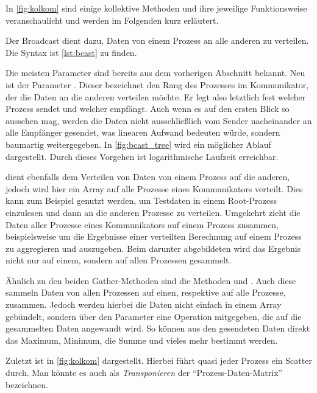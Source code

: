       In \autoref{fig:kolkom} sind einige kollektive Methoden und ihre jeweilige Funktionsweise veranschaulicht und werden im Folgenden kurz erläutert.
      
      Der Broadcast dient dazu, Daten von einem Prozess an alle anderen zu verteilen. Die Syntax ist \autoref{lst:bcast} zu finden.

      Die meisten Parameter sind bereits aus dem vorherigen Abschnitt bekannt. Neu ist der Parameter . Dieser bezeichnet den Rang des Prozesses im Kommunikator,
      der die Daten an die anderen verteilen möchte. Er legt also letztlich fest welcher Prozess sendet und welcher empfängt.
      Auch wenn es auf den ersten Blick so aussehen mag, werden die Daten nicht ausschließlich vom Sender nacheinander an alle Empfänger gesendet, was linearen Aufwand
      bedeuten würde, sondern baumartig weitergegeben. In \autoref{fig:bcast_tree} wird ein möglicher Ablauf dargestellt. Durch dieses Vorgehen ist logarithmische Laufzeit erreichbar. 
      \citep{mpitut, mpiv31}
      
       dient ebenfalls dem Verteilen von Daten von einem Prozess auf die anderen, jedoch wird hier ein Array auf alle Prozesse eines Kommunikators verteilt.
      Dies kann zum Beispiel genutzt werden, um Testdaten in einem Root-Prozess einzulesen und dann an die anderen Prozesse zu verteilen. Umgekehrt zieht  die
      Daten aller Prozesse eines Kommunikators auf einem Prozess zusammen, beispielsweise um die Ergebnisse einer verteilten Berechnung auf einem Prozess zu aggregieren und
      auszugeben. Beim darunter abgebildeten  wird das Ergebnis nicht nur auf einem, sondern auf allen Prozessen gesammelt. \citep{mpitut, mpiv31}
      
      Ähnlich zu den beiden Gather-Methoden sind die Methoden  und . Auch diese sammeln Daten von allen Prozessen auf einen, respektive
      auf alle Prozesse, zusammen. Jedoch werden hierbei die Daten nicht einfach in einem Array gebündelt, sondern über den Parameter  eine Operation mitgegeben,
      die auf die gesammelten Daten angewandt wird. So können aus den gesendeten Daten direkt das Maximum, Minimum, die Summe und vieles mehr bestimmt werden. \citep{mpitut, mpiv31}
      
      Zuletzt ist  in \autoref{fig:kolkom} dargestellt. Hierbei führt quasi jeder Prozess ein Scatter durch. Man könnte es auch als \textit{Transponieren} der
      ``Prozess-Daten-Matrix'' bezeichnen. \citep{mpiv31}
      
